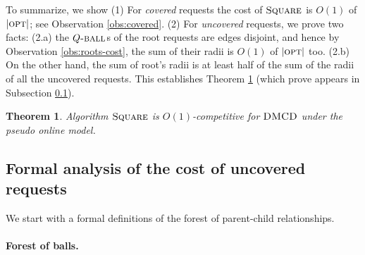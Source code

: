 \documentclass[11pt]{article}
\newtheorem{theorem}{Theorem}[section]
\def\blackslug{\hbox{\hskip 1pt \vrule width 4pt height 8pt
    depth 1.5pt \hskip 1pt}}
\def\QED{\quad\blackslug\lower 8.5pt\null\par}
\newcommand{\DMCD}{\mbox{\sc DMCD}}
\newcommand{\calR}{\mathcal{R}}
\newcommand{\opt}{\mbox{\textsc{opt}}}
\newcommand{\Square}[0]{\mbox{\sc Square}}
\newcommand{\rhoSQ}[0]{\rho^{\mbox{\small\upshape SQ}}}
\newcommand{\roots}[0]{\mbox{\sc roots}}
\newcommand{\uncover}[0]{\mbox{\sc uncover}}
\newcommand{\Qball}[0]{Q{\mbox{\sc -ball}}}
\begin{document}
To summarize, we show
(1) For {\em covered} requests the cost of $\Square$ is $O(1)$ of $|\opt|$; see Observation \ref{obs:covered}.
(2) For {\em uncovered} requests, we prove
two facts:
(2.a) the $\Qball$s of the root requests are edges disjoint, and hence by
Observation \ref{obs:roots-cost}, the sum of their radii is $O(1)$ of $|\opt|$ too.
(2.b) On the other hand, the sum of root's radii is at least half of the sum of the radii of all the uncovered requests.
This establishes Theorem \ref{thm: square is O(1)-approx} (which prove appears in Subsection \ref{subsec: Formal Ana Square}).


\begin{theorem}
Algorithm $\Square$ is $O(1)$-competitive for
$\DMCD$ under the pseudo online model.
\label{thm: square is O(1)-approx}
\end{theorem}
\def\AppSquareThm{
The ratio for covered request follows Inequality (\ref{ineq:sqr: opt geq sum cover radii}).
For uncovered requests it follows from
Observation \ref{obs:roots-distjoint} and Observation \ref{obser:sqr:opt geq sum rho_i} that
$
|\opt| \geq \sum_{i\in\roots}\rhoSQ(i).
$
Combining this with Lemma
\ref{lema:sqr:root radi geq sum of its children}, we have,
$
2|\opt| \geq \sum_{i\in\uncover}\rhoSQ(i).
$
Thus, also,
$
3|\opt| \geq \sum_{r_i\in\calR}\rhoSQ(i).
$
The Theorem follows from Observation
\ref{obser:sqr: cost Square > 14 sum radii}.
\QED
} 











\subsection{Formal analysis of the cost of uncovered requests}
\label{subsec: Formal Ana Square}

We start with a formal definitions of the forest of parent-child relationships.
\paragraph*{Forest of balls.}
\end{document}

